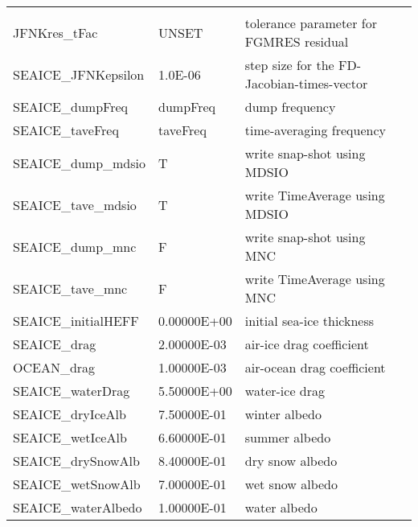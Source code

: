 \begin{table}[!ht]
{\begin{tabular}{|llp{5cm}c|}
    &  %
    \\
    JFNKres\_tFac            & UNSET
    & tolerance parameter for FGMRES residual
    &  %
    \\
    SEAICE\_JFNKepsilon      & 1.0E-06
    & step size for the FD-Jacobian-times-vector 
    &  %
    \\
    SEAICE\_dumpFreq     &                   dumpFreq
    &   dump frequency
    &  %
    \\
   SEAICE\_taveFreq     &                   taveFreq
    &   time-averaging frequency 
    &  %
    \\
   SEAICE\_dump\_mdsio   &                     T
    &   write snap-shot   using MDSIO 
    &  %
    \\
   SEAICE\_tave\_mdsio   &                     T
    &   write TimeAverage using MDSIO 
    &  %
    \\
   SEAICE\_dump\_mnc     &                     F
    &   write snap-shot   using MNC 
    &  %
    \\
   SEAICE\_tave\_mnc     &                     F
    &   write TimeAverage using MNC 
    &  %
    \\
   SEAICE\_initialHEFF  &                   0.00000E+00
    &   initial sea-ice thickness 
    &  %
    \\
   SEAICE\_drag         &                   2.00000E-03
    &   air-ice drag coefficient 
    &  %
    \\
   OCEAN\_drag          &                   1.00000E-03
    &   air-ocean drag coefficient 
    &  %
    \\
   SEAICE\_waterDrag    &                   5.50000E+00
    &   water-ice drag 
    &  %
    \\
   SEAICE\_dryIceAlb    &                   7.50000E-01
    &   winter albedo 
    &  %
    \\
   SEAICE\_wetIceAlb    &                   6.60000E-01
    &   summer albedo 
    &  %
    \\
   SEAICE\_drySnowAlb   &                   8.40000E-01
    &   dry snow albedo 
    &  %
    \\
   SEAICE\_wetSnowAlb   &                   7.00000E-01
    &   wet snow albedo 
    &  %
    \\
   SEAICE\_waterAlbedo  &                   1.00000E-01
    &   water albedo 
    &  %
    \\

\end{tabular}}
\end{table}
